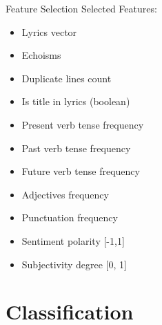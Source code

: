 \documentclass[xcolor=dvipsnames]{beamer}
\begin{document}
\begin{frame}{Feature Selection}
Selected Features: 
\begin{itemize}
\item Lyrics vector
\item Echoisms
\item Duplicate lines count
\item Is title in lyrics (boolean)
\item Present verb tense frequency
\item Past verb tense frequency
\item Future verb tense frequency
\item Adjectives frequency
\item Punctuation frequency
\item Sentiment polarity [-1,1]
\item Subjectivity degree [0, 1]
\end{itemize}
\end{frame}

\section{Classification}
\end{document}
